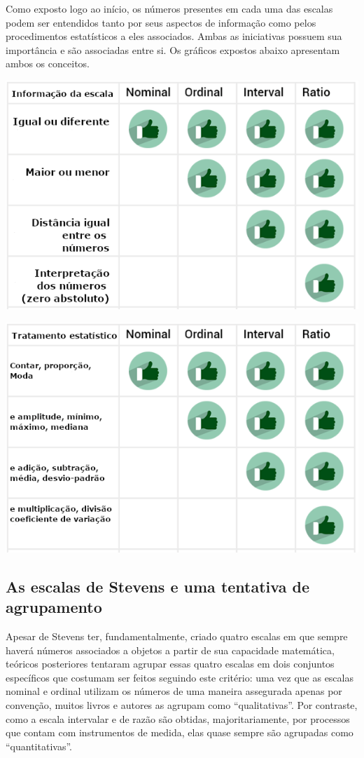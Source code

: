 \documentclass[
]{book}
\begin{document}
Como exposto logo ao início, os números presentes em cada uma das escalas podem ser entendidos tanto por seus aspectos de informação como pelos procedimentos estatísticos a eles associados. Ambas as iniciativas possuem sua importância e são associadas entre si. Os gráficos expostos abaixo apresentam ambos os conceitos.

\includegraphics{./img/cap_escala_medida_informacao.png}

\includegraphics{./img/cap_escala_medida_analises.png}

\hypertarget{as-escalas-de-stevens-e-uma-tentativa-de-agrupamento}{%
\subsection{As escalas de Stevens e uma tentativa de agrupamento}\label{as-escalas-de-stevens-e-uma-tentativa-de-agrupamento}}

Apesar de Stevens ter, fundamentalmente, criado quatro escalas em que sempre haverá números associados a objetos a partir de sua capacidade matemática, teóricos posteriores tentaram agrupar essas quatro escalas em dois conjuntos específicos que costumam ser feitos seguindo este critério: uma vez que as escalas nominal e ordinal utilizam os números de uma maneira assegurada apenas por convenção, muitos livros e autores as agrupam como ``qualitativas''. Por contraste, como a escala intervalar e de razão são obtidas, majoritariamente, por processos que contam com instrumentos de medida, elas quase sempre são agrupadas como ``quantitativas''.
\end{document}

